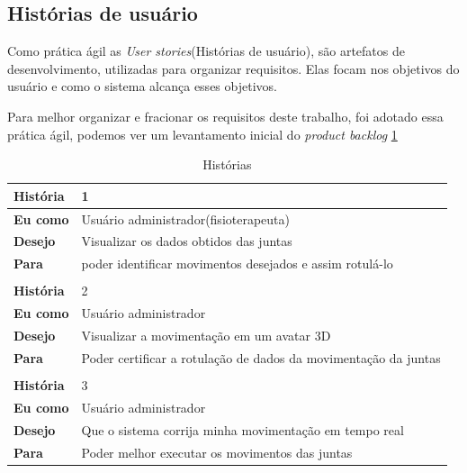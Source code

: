 \subsection{Histórias de usuário}
\label{Sec:Histórias de usuário}
  Como prática ágil as \textit{User stories}(Histórias de usuário), são artefatos
de desenvolvimento, utilizadas para organizar requisitos. Elas focam nos objetivos
do usuário e como o sistema alcança esses objetivos.
  
  Para melhor organizar e fracionar os requisitos deste trabalho, foi adotado 
essa prática ágil, podemos ver um levantamento inicial do \textit{product backlog} \ref{historias}
\begin{table}[]
\centering
\caption{Histórias}
\label{historias}
\begin{tabular}{|l|l|}
\hline
\textbf{História} & 1                                                        \\ \hline
\textbf{Eu como}  & Usuário administrador(fisioterapeuta)                    \\ \hline
\textbf{Desejo}   & Visualizar os dados obtidos das juntas                   \\ \hline
\textbf{Para}     & poder identificar movimentos desejados e assim rotulá-lo \\ \hline
 \multicolumn{2}{|l|}{}                                                       \\ \hline
\textbf{História} & 2                                                        \\ \hline
\textbf{Eu como}  & Usuário administrador                                    \\ \hline
\textbf{Desejo}   & Visualizar a movimentação em um avatar 3D                \\ \hline
\textbf{Para}     & Poder certificar a rotulação de dados da movimentação da juntas\\ \hline
\multicolumn{2}{|l|}{}                                                       \\ \hline
\textbf{História} & 3                                                        \\ \hline
\textbf{Eu como}  & Usuário administrador                                    \\ \hline
\textbf{Desejo}   & Que o sistema corrija minha movimentação em tempo real   \\ \hline
\textbf{Para}     & Poder melhor executar os movimentos das juntas           \\ \hline

\end{tabular}
\end{table}
